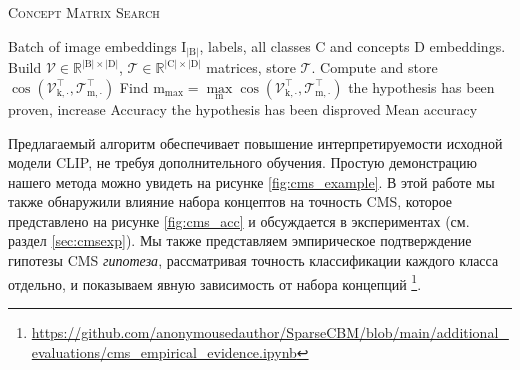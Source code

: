 \begin{algorithm}[tb]
    \caption{\textsc{Concept Matrix Search}}
    \label{Alg:CMS}
    \begin{algorithmic}[1]
         Batch of image embeddings $\mathrm{I_{|\mathrm{B}|}}$,  labels, all classes $\mathrm{C}$ and concepts $\mathrm{D}$ embeddings.
            \State Build $\mathcal{V} \in \mathbb{R}^{|\mathrm{B}|\times |\mathrm{D}|}$, $\mathcal{T} \in \mathbb{R}^{|\mathrm{C}|\times |\mathrm{D}|}$ matrices, store $\mathcal{T}$.
                    \State Compute and store $\cos(\mathcal{V}^\top_{\mathrm{k},\cdot}, \mathcal{T}^\top_{\mathrm{m},\cdot})$
                \EndFor
                \State Find $\mathrm{m}_{\mathrm{max}}=\underset{\mathrm{m}}{\operatorname{max}}\cos(\mathcal{V}^\top_{\mathrm{k},\cdot}, \mathcal{T}^\top_{\mathrm{m},\cdot})$
                    \State the hypothesis has been proven, increase Accuracy
                \Else
                    \State the hypothesis has been disproved
                \EndIf
            \EndFor
            \State \Return Mean accuracy
    \end{algorithmic}
\end{algorithm}

Предлагаемый алгоритм обеспечивает повышение интерпретируемости исходной модели CLIP, не требуя дополнительного обучения. Простую демонстрацию нашего метода можно увидеть на рисунке \cref{fig:cms_example}. В этой работе мы также обнаружили влияние набора концептов на точность CMS, которое представлено на рисунке \ref{fig:cms_acc} и обсуждается в экспериментах (см. раздел \ref{sec:cmsexp}). Мы также представляем эмпирическое подтверждение гипотезы CMS \textit{гипотеза}, рассматривая точность классификации каждого класса отдельно, и показываем явную зависимость от набора концепций \footnote{\url{https://github.com/anonymousedauthor/SparseCBM/blob/main/additional_evaluations/cms_empirical_evidence.ipynb}}.

